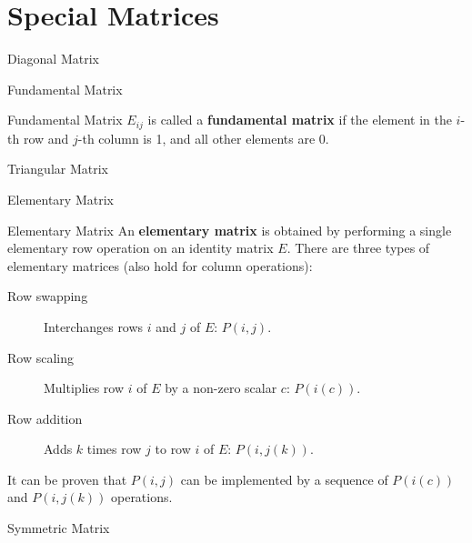\documentclass[11pt]{../../TexTemplate/elegantbook} %
\begin{document}
\section{Special Matrices}
\begin{leftbarTitle}{Diagonal Matrix}\end{leftbarTitle}

\begin{leftbarTitle}{Fundamental Matrix}\end{leftbarTitle}
\begin{definition}{Fundamental Matrix}
    \(E_{ij}\) is called a \textbf{fundamental matrix} if the element in the \(i\)-th row and \(j\)-th column is 1,
    and all other elements are 0.
\end{definition}

\begin{property}
    
\end{property}

\begin{leftbarTitle}{Triangular Matrix}\end{leftbarTitle}

\begin{leftbarTitle}{Elementary Matrix}\end{leftbarTitle}
\begin{definition}{Elementary Matrix}
    An \textbf{elementary matrix} is obtained by performing a single elementary row operation on an identity matrix \(E\).
    There are three types of elementary matrices (also hold for column operations):
    \begin{description}
        \item [Row swapping] Interchanges rows \(i\) and \(j\) of \(E\): \(P(i,j)\).
        \item [Row scaling] Multiplies row \(i\) of \(E\) by a non-zero scalar \(c\): \(P(i(c))\).
        \item [Row addition] Adds \(k\) times row \(j\) to row \(i\) of \(E\): \(P(i,j(k))\).
    \end{description}
\end{definition}

\begin{note}
    It can be proven that \(P(i,j)\) can be implemented by a sequence of \(P(i(c))\) and \(P(i,j(k))\) operations.
\end{note}

\begin{leftbarTitle}{Symmetric Matrix}\end{leftbarTitle}
\end{document}
